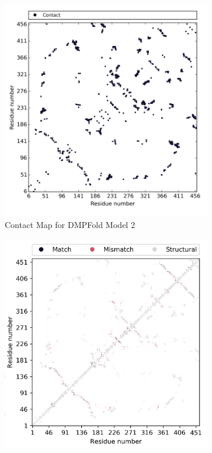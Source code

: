 \begin{figure}[htb]
    \centering %
\begin{subfigure}{0.25\textwidth}
  \includegraphics[width=\linewidth]{Modelling of Atg9/dmp_m2_cmap.png}
  \caption{Contact Map for DMPFold Model 2}
  \label{fig:0}
\end{subfigure}\hfil %
\begin{subfigure}{0.25\textwidth}
  \includegraphics[width=\linewidth]{Modelling of Atg9/dmp_m2_super.png}

\end{subfigure}
\end{figure}
